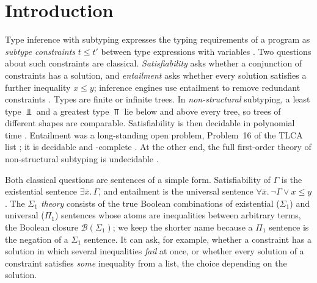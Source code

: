 \section{Introduction}
\label{sec:intro}

Type inference with subtyping expresses the typing requirements of a program as
\emph{subtype constraints} $t\le t'$ between type expressions with variables
\cite{Mitchell91,FuhMishra90,AikenWimmers93,EifrigSmithTrifonov95,Pottier98}. Two questions
about such constraints are classical. \emph{Satisfiability} asks whether a conjunction of
constraints has a solution, and \emph{entailment} asks whether every solution satisfies a
further inequality $x\le y$; inference engines use entailment to remove redundant
constraints \cite{Pottier96,TrifonovSmith96,Pottier01}. Types are finite or infinite trees.
In \emph{non-structural} subtyping, a least type $\Bot$ and a greatest type $\Top$ lie
below and above every tree, so trees of different shapes are comparable. Satisfiability is
then decidable in polynomial time \cite{KozenPalsbergSchwartzbach94,PalsbergWandOKeefe97}.
Entailment was a long-standing open problem, Problem~16 of the TLCA list
\cite{Rehof06TLCA}; it is decidable and \coNExp-complete \cite{NSSE26}. At the other end,
the full first-order theory of non-structural subtyping is undecidable
\cite{SuAikenNiehrenPriesnitzTreinen02}.

Both classical questions are sentences of a simple form. Satisfiability of $\Gamma$ is the
existential sentence $\exists\bar x.\,\Gamma$, and entailment is the universal sentence
$\forall\bar x.\,\neg\Gamma\lor x\le y$. The \emph{$\Sigma_1$ theory} consists of the true
Boolean combinations of existential ($\Sigma_1$) and universal ($\Pi_1$) sentences whose
atoms are inequalities between arbitrary terms, the Boolean closure $\mathcal B(\Sigma_1)$;
we keep the shorter name because a $\Pi_1$ sentence is the negation of a $\Sigma_1$
sentence. It can ask, for example, whether a
constraint has a solution in which several inequalities \emph{fail} at once, or whether
every solution of a constraint satisfies \emph{some} inequality from a list, the choice
depending on the solution.

